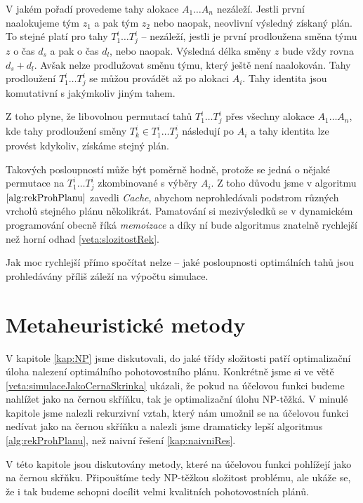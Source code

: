 V jakém pořadí provedeme tahy alokace $A_1 \dots A_n$ nezáleží. Jestli první naalokujeme tým $z_1$ a pak tým $z_2$ nebo naopak, neovlivní výsledný získaný plán.
To stejné platí pro tahy $T^i_1 \dots T^i_j$ -- nezáleží, jestli je první prodloužena směna týmu $z$ o čas $d_s$ a pak o čas $d_l$, nebo naopak. Výsledná délka směny $z$ bude vždy rovna $d_s + d_l$.
Avšak nelze prodlužovat směnu týmu, který ještě není naalokován. Tahy prodloužení $T^i_1 \dots T^i_j$ se můžou provádět až po alokaci $A_i$.
Tahy identita jsou komutativní s jakýmkoliv jiným tahem.

Z toho plyne, že libovolnou permutací tahů $T^i_1 \dots T^i_j$ přes všechny alokace $A_1 \dots A_n$, kde tahy prodloužení směny $T^i_k \in T^i_1 \dots T^i_j$ následují po $A_i$
a tahy identita lze provést kdykoliv, získáme stejný plán.

Takových posloupností může být poměrně hodně, protože se jedná o nějaké permutace na $T^i_1 \dots T^i_j$ zkombinované s výběry $A_i$.
Z toho důvodu jsme v algoritmu $\ref{alg:rekProhPlanu}$ zavedli \textit{Cache}, abychom neprohledávali podstrom různých vrcholů stejného plánu několikrát.
Pamatování si mezivýsledků se v dynamickém programování obecně říká \textit{memoizace} a díky ní bude algoritmus znatelně rychlejší než horní odhad \ref{veta:slozitostRek}.

Jak moc rychlejší přímo spočítat nelze -- jaké posloupnosti optimálních tahů jsou prohledávány příliš záleží na výpočtu simulace. 

\section{Metaheuristické metody}\label{kap:heuristiky}

V kapitole \ref{kap:NP} jsme diskutovali, do jaké třídy složitosti patří optimalizační úloha nalezení optimálního pohotovostního plánu.
Konkrétně jsme si ve větě \ref{veta:simulaceJakoCernaSkrinka} ukázali, že pokud na účelovou funkci budeme nahlížet jako na černou skříňku,
tak je optimalizační úlohu NP-těžká. V minulé kapitole jsme nalezli rekurzivní vztah, který nám umožnil se na
účelovou funkci nedívat jako na černou skříňku a nalezli jsme dramaticky lepší algoritmus \ref{alg:rekProhPlanu}, než naivní řešení \ref{kap:naivniRes}.

V této kapitole jsou diskutovány metody, které na účelovou funkci pohlížejí jako na černou skřňku. 
Připouštíme tedy NP-těžkou složitost problému, ale ukáže se, že i tak budeme schopni docílit velmi kvalitních pohotovostních plánů.

